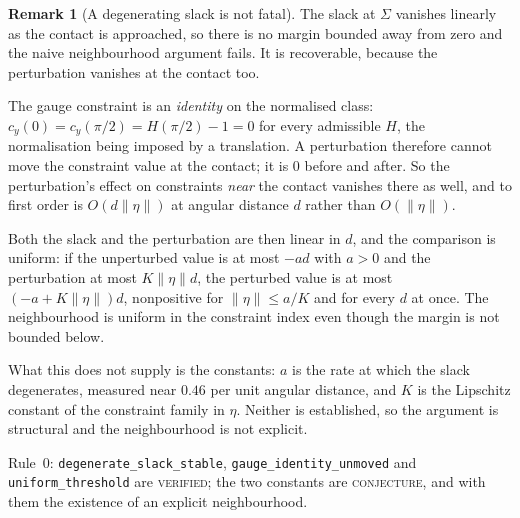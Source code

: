 \documentclass[11pt]{article}
\theoremstyle{definition}
\newtheorem{remark}[theorem]{Remark}
\newcommand{\Sig}{\Sigma}
\begin{document}
\begin{remark}[A degenerating slack is not fatal]\label{rem:v20}
The slack at $\Sig$ vanishes linearly as the contact is approached, so there is no margin
bounded away from zero and the naive neighbourhood argument fails. It is recoverable, because
the perturbation vanishes at the contact too.

The gauge constraint is an \emph{identity} on the normalised class: $c_y(0)=c_y(\pi/2)
=H(\pi/2)-1=0$ for every admissible $H$, the normalisation being imposed by a translation. A
perturbation therefore cannot move the constraint value at the contact; it is $0$ before and
after. So the perturbation's effect on constraints \emph{near} the contact vanishes there as
well, and to first order is $O(d\|\eta\|)$ at angular distance $d$ rather than $O(\|\eta\|)$.

Both the slack and the perturbation are then linear in $d$, and the comparison is uniform: if
the unperturbed value is at most $-ad$ with $a>0$ and the perturbation at most $K\|\eta\|d$,
the perturbed value is at most $(-a+K\|\eta\|)d$, nonpositive for $\|\eta\|\le a/K$ and for
every $d$ at once. The neighbourhood is uniform in the constraint index even though the
margin is not bounded below.

What this does not supply is the constants: $a$ is the rate at which the slack degenerates,
measured near $0.46$ per unit angular distance, and $K$ is the Lipschitz constant of the
constraint family in $\eta$. Neither is established, so the argument is structural and the
neighbourhood is not explicit.

Rule~0: \verb|degenerate_slack_stable|, \verb|gauge_identity_unmoved| and
\verb|uniform_threshold| are \textsc{verified}; the two constants are \textsc{conjecture}, and
with them the existence of an explicit neighbourhood.
\end{remark}
\end{document}
